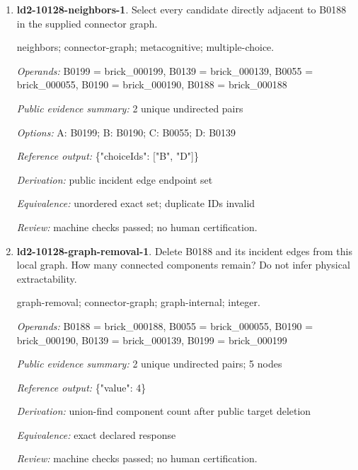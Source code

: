 \begin{enumerate}
\par{\small interface; connector-graph; metacognitive; single-choice.\par\textit{Operands:} B0249 = brick\_000249, B0270 = brick\_000270\par\textit{Public evidence summary:} \{"connectorRecord": \{"family": "stud", "aConnector": 84, "bConnector": 5\}, "scope": "Upstream connector tolerances and inset mesh intersections; unknown parts remain explicit, separate scene objects are not glued together; no load/force validation."\}\par\textit{Options:} A: hinge; B: fixed; C: ball; D: axle; E: stud\par\textit{Reference output:} \{"choiceId": "E"\}\par\textit{Derivation:} public connectorRecord.family equality\par\textit{Equivalence:} exact declared response\par\textit{Review:} machine checks passed; no human certification.}
\item \textbf{ld2-10128-neighbors-1}. Select every candidate directly adjacent to B0188 in the supplied connector graph.
\par{\small neighbors; connector-graph; metacognitive; multiple-choice.\par\textit{Operands:} B0199 = brick\_000199, B0139 = brick\_000139, B0055 = brick\_000055, B0190 = brick\_000190, B0188 = brick\_000188\par\textit{Public evidence summary:} 2 unique undirected pairs\par\textit{Options:} A: B0199; B: B0190; C: B0055; D: B0139\par\textit{Reference output:} \{"choiceIds": ["B", "D"]\}\par\textit{Derivation:} public incident edge endpoint set\par\textit{Equivalence:} unordered exact set; duplicate IDs invalid\par\textit{Review:} machine checks passed; no human certification.}
\item \textbf{ld2-10128-graph-removal-1}. Delete B0188 and its incident edges from this local graph. How many connected components remain? Do not infer physical extractability.
\par{\small graph-removal; connector-graph; graph-internal; integer.\par\textit{Operands:} B0188 = brick\_000188, B0055 = brick\_000055, B0190 = brick\_000190, B0139 = brick\_000139, B0199 = brick\_000199\par\textit{Public evidence summary:} 2 unique undirected pairs; 5 nodes\par\textit{Reference output:} \{"value": 4\}\par\textit{Derivation:} union-find component count after public target deletion\par\textit{Equivalence:} exact declared response\par\textit{Review:} machine checks passed; no human certification.}

\end{enumerate}
